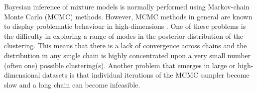 \documentclass{bioinfo}
\begin{document}



Bayesian inference of mixture models is normally performed using Markov-chain Monte Carlo (MCMC) methods. However, MCMC methods in general are known to display problematic behaviour in high-dimensions \citep{robert2018accelerating, yao2020stacking, chandra2020bayesian}. One of these problems is the difficulty in exploring a range of modes in the posterior distribution of the clustering. This means that there is a lack of convergence across chains and the distribution in any single chain is highly concentrated upon a very small number (often one) possible clustering(s). Another problem that emerges in large or high-dimensional datasets is that individual iterations of the MCMC sampler become slow and a long chain can become infeasible.


%
\end{document}
